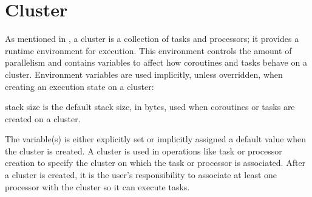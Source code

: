 \documentclass[openright,twoside]{report}
\begin{document}
\section{Cluster}
\label{s:Cluster}

As mentioned in , a cluster is a collection of \uC tasks and processors;
it provides a runtime environment for execution.
This environment controls the amount of parallelism and contains variables to affect how coroutines and tasks behave on a cluster.
Environment variables are used implicitly, unless overridden, when creating an execution state on a cluster:
\begin{prefix}
\item[stack size]
is the default stack size, in bytes, used when coroutines or tasks are created on a cluster.
\end{prefix}
The variable(s) is either explicitly set or implicitly assigned a \uC default value when the cluster is created.
A cluster is used in operations like task or processor creation to specify the cluster on which the task or processor is associated.
After a cluster is created, it is the user's responsibility to associate at least one processor with the cluster so it can execute tasks.
\end{document}
